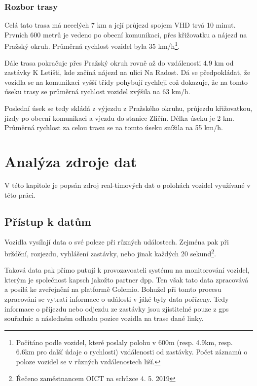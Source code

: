 \subsubsection{Rozbor trasy}

Celá tato trasa má necelých 7 km a její průjezd spojem VHD trvá 10 minut. Prvních 600 metrů je vedeno po obecní komunikaci, přes křižovatku a nájezd na Pražský okruh. Průměrná rychlost vozidel byla 35 km/h\footnote{Počítáno podle vozidel, které poslaly polohu v 600m (resp. 4.9km, resp. 6.6km pro další údaje o rychlosti) vzdálenosti od zastávky. Počet záznamů o poloze vozidel se v různých vzdálenostech liší.}.

\bigbreak

Dále trasa pokračuje přes Pražský okruh rovně až do vzdálenosti 4.9 km od zastávky K Letišti, kde začíná nájezd na ulici Na Radost. Dá se předpokládat, že vozidla se na komunikaci vyšší třídy pohybují rychleji což dokazuje, že na tomto úseku trasy se průměrná rychlost vozidel zvýšila na 63 km/h.

\bigbreak

Poslední úsek se tedy skládá z výjezdu z Pražského okruhu, průjezdu křižovatkou, jízdy po obecní komunikaci a vjezdu do stanice Zličín. Délka úseku je 2 km. Průměrná rychlost za celou trasu se na tomto úseku snížila na 55 km/h.







\section{Analýza zdroje dat} \label{section:analyza_zdroje}

V této kapitole je popsán zdroj real-timových dat o polohách vozidel využívané v této práci.

\subsection{Přístup k datům}

Vozidla vysílají data o své poleze při různých událostech. Zejména pak při brždění, rozjezdu, vyhlášení zastávky, nebo jinak každých 20 sekund\footnote{Řečeno zaměstnancem OICT na schůzce 4. 5. 2019}.

\bigbreak

Taková data pak přímo putují k provozavoateli systému na monitorování vozidel, kterým je společnost \gls{kapsch} jakožto partner \gls{dpp}. Ten však tato data zpracovává a posílá ke zveřejnění na platformě Golemio. Bohužel při tomto procesu zpracování se vytratí informace o události v jáké byly data pořízeny. Tedy informace o příjezdu nebo odjezdu ze zastávky jsou zjistitelné pouze z \gls{gps} souřadnic a následném odhadu pozice vozidla na trase dané linky.

